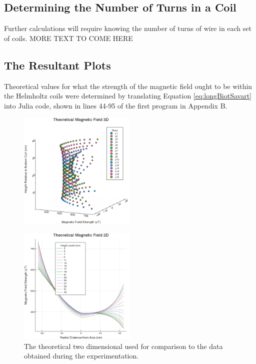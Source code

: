 \documentclass[a4paper]{article}
\begin{document}
\subsection{Determining the Number of Turns in a Coil}

\qq Further calculations will require knowing the number of turns of wire in each
set of coils. MORE TEXT TO COME HERE

\subsection{The Resultant Plots}
\qq Theoretical values for what the strength of the magnetic field ought to be
within the Helmholtz coils were determined by translating Equation
\ref{eq:longBiotSavart} into Julia code, shown in lines 44-95 of the first
program in Appendix B. 

\begin{figure}[H]
\centering
\includegraphics[width=0.5\textwidth]{3DPlotTheoretical.png}


\label{Theoretical 3-D plot}
\end{figure}


\begin{figure}[H]
  \begin{center}
    \includegraphics[width=0.5\textwidth]{2DPlotTheoretical.png}
  \end{center}
  \caption{The theoretical two dimensional used for comparison to the data
    obtained during the experimentation.}
  \label{Theoretical 2-D plot}

\end{figure}
\end{document}
